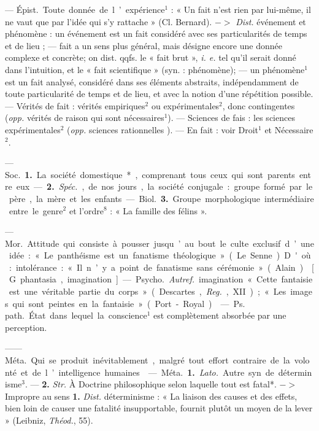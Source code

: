\begin{itemize}[leftmargin=1cm, label=, itemsep=1pt]
 — \si{Épist.} Toute donnée de l’expérience$^1$ : « Un fait n'est rien par
lui-même, il ne vaut que par l’idée
qui s’y rattache » (Cl. Bernard).
$->$ {\it Dist.} événement et phénomène : un événement est un fait considéré avec ses particularités de
temps et de lieu ; — fait a un sens
plus général, mais désigne encore
une donnée complexe et concrète;
on dist. qqfs. le « fait brut », {\it i. e.} tel
qu'il serait donné dans l'intuition,
et le « fait scientifique » (syn. : phénomène); — un phénomène$^1$ est un
fait analysé, considéré dans ses
éléments abstraits, indépendamment de toute particularité de temps
et de lieu, et avec la notion d’une
répétition possible. — Vérités de
fait : vérités empiriques$^2$ ou expérimentales$^2$, donc contingentes ({\it opp.}
vérités de raison qui sont nécessaires$^1$). — Sciences de fais :
les sciences expérimentales$^2$ ({\it opp.}
sciences rationnelles ). — En fait :
voir Droit$^1$ et Nécessaire$^2$.

 — \si{Soc.} {\bf 1.} La société domestique*, comprenant tous ceux qui
sont parents entre eux. — {\bf 2.} {\it Spéc.},
de nos jours, la société conjugale :
groupe formé par le père, la mère
et les enfants.

— \si{Biol.} {\bf 3.} Groupe morphologique intermédiaire entre le genre$^2$
et l’ordre$^8$ : « La famille des
félins ».

 — \si{Mor.} Attitude qui consiste à pousser jusqu’au bout le
culte exclusif d’une idée : « Le panthéisme est un fanatisme théologique » (Le Senne). D'où : intolérance :
« Il n’y a point de fanatisme
sans cérémonie » (Alain).

 [G. phantasia, imagination].
— \si{Psycho.} {\it Autref.} imagination
« Cette fantaisie est une véritable
partie du corps » (Descartes, {\it Reg.},
XII); « Les images qui sont peintes
en la fantaisie » (Port-Royal).

 — \si{Ps. path.} État dans
lequel la conscience$^1$ est complètement absorbée par une perception.

 —— \si{Méta.} Qui se produit inévitablement, malgré tout effort contraire de la volonté et de l’intelligence humaines.

 — \si{Méta.} {\bf 1.} {\it Lato.} Autre.
syn. de déterminisme$^3$. — {\bf 2.} {\it Str.}
À Doctrine philosophique selon laquelle tout est fatal*. $->$ Impropre
au sens {\bf 1.} {\it Dist.} déterminisme : « La
liaison des causes et des effets, bien
loin de causer une fatalité insupportable, fournit plutôt un moyen de
la lever » (Leibniz, {\it Théod.}, 55).


\end{itemize}
